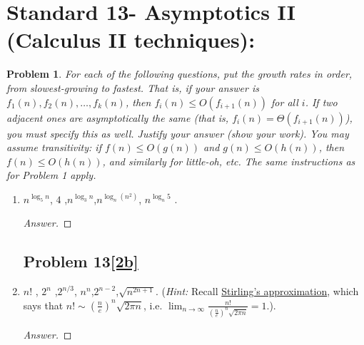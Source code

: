 \documentclass[11pt]{article}
\theoremstyle{definition}
\theoremstyle{definition}
\newtheorem{required}{Problem}
\theoremstyle{definition}
\begin{document}
\newpage
\section{Standard 13- Asymptotics II (Calculus II techniques): }
\begin{required}



    {\itshape For each of the following questions, put the growth rates in order, from slowest-growing to fastest. That is, if your answer is $f_1(n), f_2(n), \dotsc, f_k(n)$, then $f_i(n) \leq O(f_{i+1}(n))$ for all $i$. If two adjacent ones are asymptotically the same (that is, $f_i(n) = \Theta(f_{i+1}(n))$), you must specify this as well. 
    Justify your answer (show your work). You may assume transitivity: if $f(n) \leq O(g(n))$ and $g(n) \leq O(h(n))$, then $f(n) \leq O(h(n))$, and similarly for little-oh, etc. The same instructions as for Problem 1 apply.}
    \begin{enumerate}[label=(\alph*)]
\subsection{Problem 13\ref{2a}}
        \item \label{2a} $n^{\log_5 n}$, \qquad $4$ ,\qquad $n^{\log_3 n}$,\qquad  $n^{\log_n(n^2)}$, \qquad $ n^{\log_n 5}$ .
        \begin{proof}[Answer]

        \end{proof}
        \newpage

\subsection{Problem 13\ref{2b}}
        \item \label{2b} $n!$ , \qquad $2^n$ ,\qquad  $2^{n/3}$, \qquad  $n^n$,\qquad $2^{n-2}$,\qquad  $\sqrt{n^{2n+1}}$. (\emph{Hint:} Recall \href{https://en.wikipedia.org/wiki/Stirling\%27s_approximation}{Stirling's approximation}, which says that $n! \sim \left(\frac{n}{e}\right)^n \sqrt{2 \pi n}$, i.e. $\lim_{n \to \infty} \frac{n!}{\left(\frac{n}{e}\right)^n \sqrt{2 \pi n}} = 1$.).
        \begin{proof}[Answer]

        \end{proof}
\end{enumerate}

\end{required}

\newpage
\end{document}
